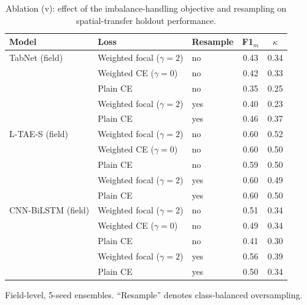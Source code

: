 \documentclass[preprint,authoryear,3p]{elsarticle}
\begin{document}
\begin{table}[!t]
\centering
\scriptsize
\caption{Ablation (v): effect of the imbalance-handling objective and resampling on spatial-transfer
holdout performance.}
\label{stab:loss}
\renewcommand{\arraystretch}{1.12}
\setlength{\tabcolsep}{8pt}
\begin{tabular}{lllcc}
\toprule
\textbf{Model} & \textbf{Loss} & \textbf{Resample} & \textbf{F1$_m$} & \textbf{$\kappa$} \\
\midrule
TabNet (field)     & Weighted focal ($\gamma{=}2$) & no  & 0.43 & 0.34 \\
                   & Weighted CE ($\gamma{=}0$)    & no  & 0.42 & 0.33 \\
                   & Plain CE                       & no  & 0.35 & 0.25 \\
                   & Weighted focal ($\gamma{=}2$) & yes & 0.40 & 0.23 \\
                   & Plain CE                       & yes & 0.46 & 0.37 \\
\midrule
L-TAE-S (field)    & Weighted focal ($\gamma{=}2$) & no  & 0.60 & 0.52 \\
                   & Weighted CE ($\gamma{=}0$)    & no  & 0.60 & 0.50 \\
                   & Plain CE                       & no  & 0.59 & 0.50 \\
                   & Weighted focal ($\gamma{=}2$) & yes & 0.60 & 0.49 \\
                   & Plain CE                       & yes & 0.60 & 0.50 \\
\midrule
CNN-BiLSTM (field) & Weighted focal ($\gamma{=}2$) & no  & 0.51 & 0.34 \\
                   & Weighted CE ($\gamma{=}0$)    & no  & 0.49 & 0.34 \\
                   & Plain CE                       & no  & 0.41 & 0.30 \\
                   & Weighted focal ($\gamma{=}2$) & yes & 0.56 & 0.39 \\
                   & Plain CE                       & yes & 0.50 & 0.34 \\
\bottomrule
\end{tabular}
\par\vspace{3pt}
\begin{minipage}{\linewidth}
\footnotesize
Field-level, 5-seed ensembles. ``Resample'' denotes class-balanced oversampling.
\end{minipage}
\end{table}



\end{document}
